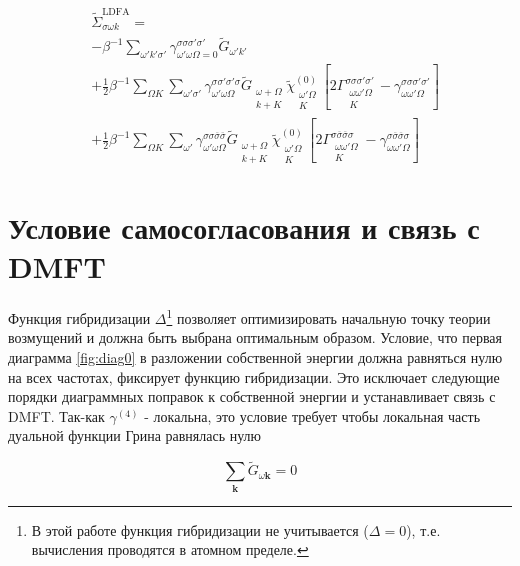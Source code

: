\documentclass[11pt,a4paper]{report}
\begin{document}
\begin{equation}
\label{eq:LDFA}
\begin{split}
 &\tilde{\Sigma}^{\text{LDFA}}_{\sigma\omega k} = \\
 &-\beta^{-1}\sum_{\omega'k'\sigma'}\gamma^{\sigma\sigma\sigma'\sigma'}_{\omega'\omega\Omega=0}\tilde{G}_{\omega'k'} \\
 &+\frac{1}{2}\beta^{-1}\sum_{\Omega K}\sum_{\omega'\sigma'}\gamma^{\sigma\sigma'\sigma'\sigma}_{\omega'\omega\Omega}\tilde{G}_{\substack{\omega+\Omega\\k+K}}\tilde{\chi}^{(0)}_{\substack{\omega'\Omega\\K}}\left[2\Gamma^{\sigma\sigma\sigma'\sigma'}_{\substack{\omega\omega'\Omega\\K}}-\gamma^{\sigma\sigma\sigma'\sigma'}_{\omega\omega'\Omega}\right] \\
 &+\frac{1}{2}\beta^{-1}\sum_{\Omega K}\sum_{\omega'}\gamma^{\sigma\sigma\overline{\sigma}\overline{\sigma}}_{\omega'\omega\Omega}\tilde{G}_{\substack{\omega+\Omega\\k+K}}\tilde{\chi}^{(0)}_{\substack{\omega'\Omega\\K}}\left[2\Gamma^{\sigma\overline{\sigma}\overline{\sigma}\sigma}_{\substack{\omega\omega'\Omega\\K}}-\gamma^{\sigma\overline{\sigma}\overline{\sigma}\sigma}_{\omega\omega'\Omega}\right]
\end{split}
\end{equation}

\section{Условие самосогласования и связь с DMFT}

Функция гибридизации $\Delta$\footnote{В этой работе функция гибридизации не учитывается ($\Delta = 0$), т.е. вычисления проводятся в атомном пределе.}
позволяет оптимизировать начальную точку теории возмущений и должна быть выбрана оптимальным образом. Условие, что первая диаграмма \ref{fig:diag0} в разложении собственной энергии должна
равняться нулю на всех частотах, фиксирует функцию гибридизации. Это исключает следующие порядки диаграммных поправок к собственной энергии и устанавливает связь с DMFT. Так-как $\gamma^{(4)}$ - 
локальна, это условие требует чтобы локальная часть дуальной функции Грина равнялась нулю

\begin{equation}
\label{self-cons}
 \sum_\mathbf{k} \tilde{G}_{\omega\mathbf{k}} = 0
\end{equation}
\end{document}
